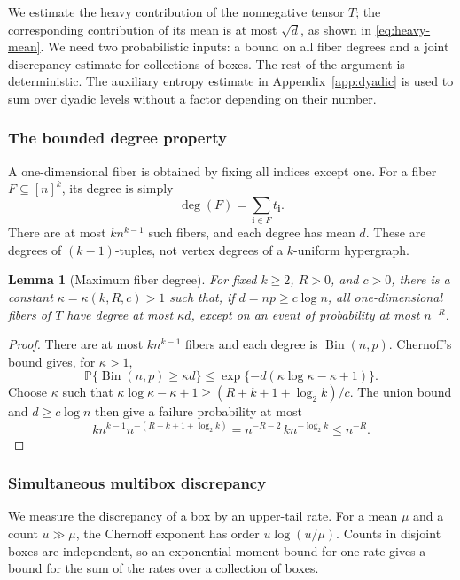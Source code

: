 \documentclass[10pt,a4paper]{amsart}
\numberwithin{equation}{section}
\newtheorem{lemma}[theorem]{Lemma}
\newcommand{\Pp}{\mathbb P}
\begin{document}
We estimate the heavy contribution of the nonnegative tensor $T$;
the corresponding contribution of its mean is at most $\sqrt d$,
as shown in \eqref{eq:heavy-mean}. We need two probabilistic inputs:
a bound on all fiber degrees and a joint discrepancy estimate for
collections of boxes. The rest of the argument is deterministic.
The auxiliary entropy estimate in Appendix~\ref{app:dyadic} is used
to sum over dyadic levels without a factor depending on their number.

\subsubsection{The bounded degree property}\label{sec:degrees}

A one-dimensional fiber is obtained by fixing all indices except one.
For a fiber $F\subseteq[n]^k$, its degree is simply
\[
 \deg(F)=\sum_{\mathbf i\in F}t_{\mathbf i}.
\]
There are at most $kn^{k-1}$ such fibers, and each degree has mean $d$.
These are degrees of $(k-1)$-tuples, not vertex degrees of a
$k$-uniform hypergraph.
\begin{lemma}[Maximum fiber degree]\label{lem:fibers}
For fixed $k\ge2$, $R>0$, and $c>0$, there is a constant
$\kappa=\kappa(k,R,c)>1$ such that, if $d=np\ge c\log n$, all
one-dimensional fibers of $T$ have degree at most $\kappa d$,
except on an event of probability at most
$n^{-R}$.
\end{lemma}
\begin{proof}
There are at most $kn^{k-1}$ fibers and each degree is
$\operatorname{Bin}(n,p)$. Chernoff's bound gives, for $\kappa>1$,
\[
 \Pp\{\operatorname{Bin}(n,p)\ge\kappa d\}
 \le\exp\{-d(\kappa\log\kappa-\kappa+1)\}.
\]
Choose $\kappa$ such that
$\kappa\log\kappa-\kappa+1\ge (R+k+1+\log_2 k)/c$. The union bound and
$d\ge c\log n$ then give a failure probability at most
\[
 kn^{k-1}n^{-(R+k+1+\log_2 k)}
 =n^{-R-2}\,k n^{-\log_2 k}\le n^{-R}.
\]
\end{proof}

\subsubsection{Simultaneous multibox discrepancy}\label{sec:entropy}

We measure the discrepancy of a box by an upper-tail rate. For a
mean $\mu$ and a count $u\gg\mu$, the Chernoff exponent has order
$u\log(u/\mu)$. Counts in disjoint boxes are independent, so an
exponential-moment bound for one rate gives a bound for the sum of
the rates over a collection of boxes.
\end{document}
